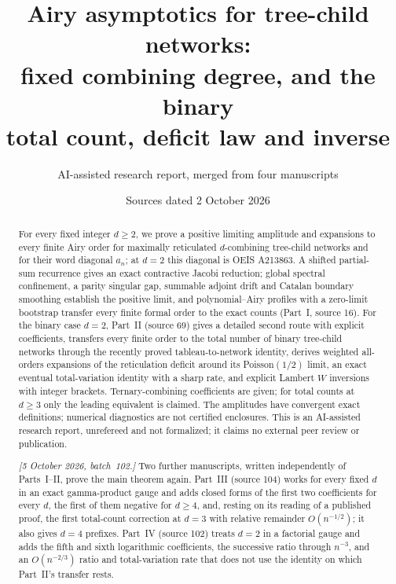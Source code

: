 \documentclass[11pt,letterpaper]{article}
\title{Airy asymptotics for tree-child networks:\\fixed combining degree, and the binary\\total count, deficit law and inverse}
\author{AI-assisted research report, merged from four manuscripts}
\date{Sources dated 2 October 2026}
\theoremstyle{remark}
\begin{document}
\maketitle\vspace{-1.3em}
\begin{abstract}
For every fixed integer $d\ge2$, we prove a positive limiting amplitude and expansions to every finite Airy order for maximally reticulated $d$-combining tree-child networks and for their word diagonal $a_n$; at $d=2$ this diagonal is OEIS A213863. A shifted partial-sum recurrence gives an exact contractive Jacobi reduction; global spectral confinement, a parity singular gap, summable adjoint drift and Catalan boundary smoothing establish the positive limit, and polynomial--Airy profiles with a zero-limit bootstrap transfer every finite formal order to the exact counts (Part~I, source 16). For the binary case $d=2$, Part~II (source 69) gives a detailed second route with explicit coefficients, transfers every finite order to the total number of binary tree-child networks through the recently proved tableau-to-network identity, derives weighted all-orders expansions of the reticulation deficit around its Poisson$(1/2)$ limit, an exact eventual total-variation identity with a sharp rate, and explicit Lambert $W$ inversions with integer brackets. Ternary-combining coefficients are given; for total counts at $d\ge3$ only the leading equivalent is claimed. The amplitudes have convergent exact definitions; numerical diagnostics are not certified enclosures. This is an AI-assisted research report, unrefereed and not formalized; it claims no external peer review or publication.

\emph{[5 October 2026, batch~102.]} Two further manuscripts, written independently of Parts~I--II, prove the main theorem again. Part~III (source 104) works for every fixed $d$ in an exact gamma-product gauge and adds closed forms of the first two coefficients for every $d$, the first of them negative for $d\ge4$, and, resting on its reading of a published proof, the first total-count correction at $d=3$ with relative remainder $O(n^{-1/2})$; it also gives $d=4$ prefixes. Part~IV (source 102) treats $d=2$ in a factorial gauge and adds the fifth and sixth logarithmic coefficients, the successive ratio through $n^{-3}$, and an $O(n^{-2/3})$ ratio and total-variation rate that does not use the identity on which Part~II's transfer rests.
\end{abstract}
\begingroup\small\setlength{\parskip}{0pt}
\makeatletter\renewcommand{}\makeatother
\tableofcontents\endgroup\newpage
\end{document}
